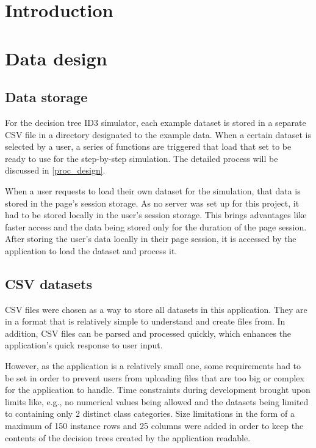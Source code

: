 
\section{Introduction}

\section{Data design}
\subsection{Data storage}
For the decision tree ID3 simulator, each example dataset is stored in a separate CSV file in a directory designated to the example data. When a certain dataset is selected by a user, a series of functions are triggered that load that set to be ready to use for the step-by-step simulation. The detailed process will be discussed in \ref{proc_design}. 

When a user requests to load their own dataset for the simulation, that data is stored in the page's session storage. As no server was set up for this project, it had to be stored locally in the user's session storage. This brings advantages like faster access and the data being stored only for the duration of the page session. After storing the user's data locally in their page session, it is accessed by the application to load the dataset and process it.

\subsection{CSV datasets}
CSV files were chosen as a way to store all datasets in this application. They are in a format that is relatively simple to understand and create files from. In addition, CSV files can be parsed and processed quickly, which enhances the application's quick response to user input.

However, as the application is a relatively small one, some requirements had to be set in order to prevent users from uploading files that are too big or complex for the application to handle. Time constraints during development brought upon limits like, e.g., no numerical values being allowed and the datasets being limited to containing only 2 distinct class categories. Size limitations in the form of a maximum of 150 instance rows and 25 columns were added in order to keep the contents of the decision trees created by the application readable.

